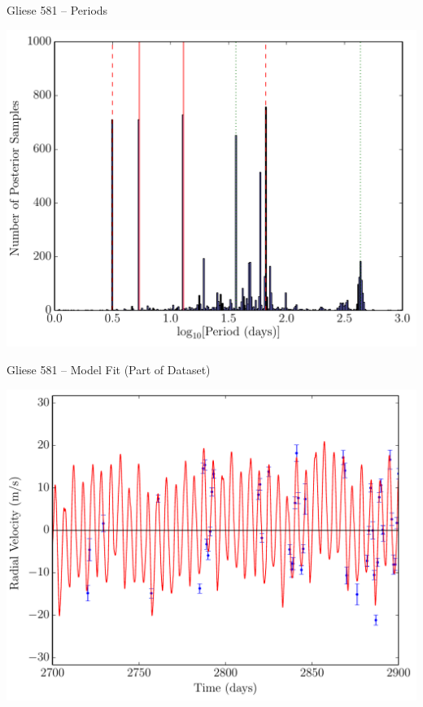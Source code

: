 \begin{frame}[t]{Gliese 581 -- Periods}
\begin{center}
\includegraphics[scale=0.4]{ExoplanetFigures/gliese581_periods.pdf}
\end{center}
\end{frame}


\begin{frame}[t]{Gliese 581 -- Model Fit (Part of Dataset)}
\begin{center}
\includegraphics[scale=0.4]{ExoplanetFigures/gliese581.pdf}
\end{center}
\end{frame}

